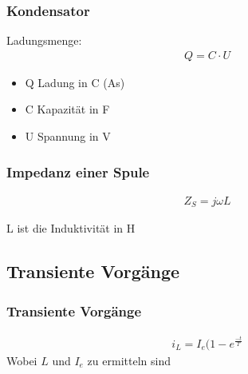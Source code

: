 \documentclass[german,ignorenonframetext]{beamer} %
\begin{document}
\begin{frame}
\frametitle{Kondensator}
Ladungsmenge:
\begin{eqnarray}
Q = C \cdot U
\end{eqnarray}

\begin{itemize}
\item Q Ladung in C (As)
\item C Kapazität in F
\item U Spannung in V
\end{itemize}
\end{frame}

\begin{frame}
\frametitle{Impedanz einer Spule}
\begin{center}
\begin{eqnarray}
Z_{S} = j \omega L
\end{eqnarray}
\end{center}
L ist die Induktivität in H
\end{frame}


\subsection{Transiente Vorgänge}
\begin{frame}
\frametitle{Transiente Vorgänge}
\begin{center}
\begin{eqnarray}
i_{L} = I_{e} ( 1 - e^{\frac{-t}{T}}
\end{eqnarray}
Wobei $L$ und $I_{e}$ zu ermitteln sind
\end{center}
\end{frame}
\end{document}
